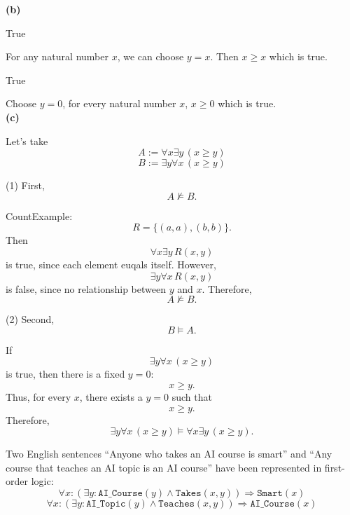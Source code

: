 \documentclass[10pt,a4paper]{exam}
\newcommand{\AICourse}{\mathtt{AI\_Course}}
\newcommand{\AITopic}{\mathtt{AI\_Topic}}
\newcommand{\Teaches}{\mathtt{Teaches}}
\newcommand{\Takes}{\mathtt{Takes}}
\newcommand{\Smart}{\mathtt{Smart}}
\begin{document}
\begin{questions}
\textbf{(b)}


True  

For any natural number $x$, we can choose $y=x$. Then $x \ge x$ which is true.


True

Choose $y=0$, for every natural number $x$, $x \ge 0$ which is true.\\

\textbf{(c)}

Let's take
\[
A := \forall x \exists y \, (x \ge y)
\]
\[
B := \exists y \forall x \, (x \ge y)
\]

(1) First,
\[
A \not\models B.
\]

CountExample:
\[
R = \{(a,a),(b,b)\}.
\]
Then
\[
\forall x \exists y \, R(x,y)
\]
is true, since each element euqals itself. However,
\[
\exists y \forall x \, R(x,y)
\]
is false, since no relationship between \(y\) and \(x\). Therefore,
\[
A \not\models B.
\]

(2) Second,
\[
B \models A.
\]

If
\[
\exists y \forall x \, (x \ge y)
\]
is true, then there is a fixed \(y = 0\):
\[
x \ge y.
\]
Thus, for every \(x\), there exists a \(y = 0\) such that
\[
x \ge y.
\]
Therefore,
\[
\exists y \forall x \, (x \ge y)
\models
\forall x \exists y \, (x \ge y).
\]

\newpage

\question[30]
Two English sentences ``Anyone who takes an AI course is smart'' and ``Any course that teaches an AI topic is an AI course'' have been represented in first-order logic:
\[
\forall x : (\exists y : \AICourse(y) \wedge \Takes(x, y)) \Rightarrow \Smart(x)
\]
\[
\forall x : (\exists y : \AITopic(y) \wedge \Teaches(x, y)) \Rightarrow \AICourse(x)
\]

\end{questions}
\end{document}

